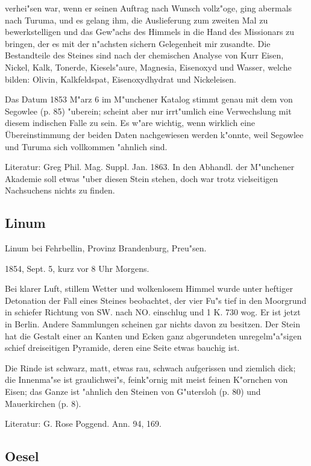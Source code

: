 \documentclass[a4paper, 11pt, oneside]{article}
\begin{document}
verhei"sen war, wenn er seinen Auftrag nach Wunsch vollz"oge, ging abermals nach Turuma, und es gelang ihm, die Auslieferung zum zweiten Mal zu bewerkstelligen und das Gew"achs des Himmels in die Hand des Missionars zu bringen, der es mit der n"achsten sichern Gelegenheit mir zusandte. Die Bestandteile des Steines sind nach der chemischen Analyse von Kurr Eisen, Nickel, Kalk, Tonerde, Kiesels"aure, Magnesia, Eisenoxyd und Wasser, welche bilden: Olivin, Kalkfeldspat, Eisenoxydhydrat und Nickeleisen.

Das Datum 1853 M"arz 6 im M"unchener Katalog stimmt genau mit dem von Segowlee (p. 85) "uberein; scheint aber nur irrt"umlich eine Verwechslung mit diesem indischen Falle zu sein. Es w"are wichtig, wenn wirklich eine Übereinstimmung der beiden Daten nachgewiesen werden k"onnte, weil Segowlee und Turuma sich vollkommen "ahnlich sind.

Literatur: Greg Phil. Mag. Suppl. Jan. 1863. In den Abhandl. der M"unchener Akademie soll etwas "uber diesen Stein stehen, doch war trotz vielseitigen Nachsuchens nichts zu finden.

\subsection{Linum}

Linum bei Fehrbellin, Provinz Brandenburg, Preu"sen.

1854, Sept. 5, kurz vor 8 Uhr Morgens.

Bei klarer Luft, stillem Wetter und wolkenlosem Himmel wurde unter heftiger Detonation der Fall eines Steines beobachtet, der vier Fu"s tief in den Moorgrund in schiefer Richtung von SW. nach NO. einschlug und 1 K. 730 wog. Er ist jetzt in Berlin. Andere Sammlungen scheinen gar nichts davon zu besitzen. Der Stein hat die Gestalt einer an Kanten und Ecken ganz abgerundeten unregelm"a"sigen schief dreiseitigen Pyramide, deren eine Seite etwas bauchig ist.

Die Rinde ist schwarz, matt, etwas rau, schwach aufgerissen und ziemlich dick; die Innenma"se ist graulichwei"s, feink"ornig mit meist feinen K"ornchen von Eisen; das Ganze ist "ahnlich den Steinen von G"utersloh (p. 80) und Mauerkirchen (p. 8).

Literatur: G. Rose Poggend. Ann. 94, 169.

\subsection{Oesel}
\end{document}
